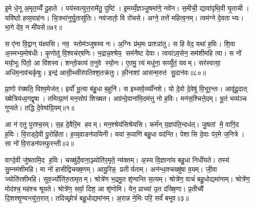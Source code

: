 इ॒मे धे॒नू अ॒मृत॒य्येँ दु॒हाते। पय॑स्वत्युत्त॒रामे॑तु॒ पुष्टि॑। इ॒मय्यँ॒ज्ञञ्जु॒षमा॑णे॒ नवे॑न। स॒मीची॒ द्यावा॑पृथि॒वी घृ॒ताची। यवि॑ष्ठो हव्य॒वाह॑नः। चि॒त्रभा॑नुर्घु॒तासु॑तिः। नव॑जातो॒ वि रो॑चसे। अग्ने॒ तत्ते॑ महित्व॒नम्। त्वम॑ग्ने दे॒वताभ्यः। भा॒गे दे॑व॒ न मी॑यसे॥७९॥

स ए॑ना वि॒द्वान् य॑क्ष्यसि। नव॒ स्तोम॑ञ्जुषस्व नः। अ॒ग्निः प्र॑थ॒मः प्राश्ञा॑तु। स हि वेद॒ यथा॑ ह॒विः। शि॒वा अ॒स्मभ्य॒मोष॑धीः। कृ॒णोतु॑ वि॒श्वच॑र्‌षणिः। भ॒द्रान्न॒श्श्रेय॒ सम॑नैष्ट देवाः। त्वया॑ऽव॒सेन॒ सम॑शीमहि त्वा। स नो॑ मयो॒भूः पि॑तो॒ आ वि॑शस्व। शन्तो॒काय॑ त॒नुवे स्यो॒नः। ए॒तमु॒ त्यं मधु॑ना॒ सय्युँ॑तं॒ यवम्। सर॑स्वत्या॒ अधि॑म॒नाव॑चर्कृषुः। इन्द्र॑ आसी॒थ्सीर॑पतिश्श॒तक्र॑तुः। की॒नाशा॑ आसन्म॒रुत॑ सु॒दान॑वः॥८०॥



\clearpage
{}
\setcounter{anuvakam}{0}
प्रा॒णो र॑ख्षति॒ विश्व॒मेज॑त्। इर्यो॑ भू॒त्वा ब॑हु॒धा ब॒हूनि॑। स इथ्सर्व॒व्व्याँ॑नशे। यो दे॒वो दे॒वेषु॑ वि॒भूर॒न्तः। आवृ॑दू॒दात् ख्षेत्रिय॑ध्व॒गद्वृषा। तमित्प्रा॒णं मन॒सोप॑ शिख्षत। अग्र॑न्दे॒वाना॑मि॒दम॑त्तु नो ह॒विः। मन॑स॒श्चित्ते॒दम्। भू॒तं भव्य॑ञ्च गुप्यते। तद्धि दे॒वेष्व॑ग्रि॒यम्॥१॥

आ न॑ एतु पुरश्च॒रम्। स॒ह दे॒वैरि॒म हवम्। मन॒श्श्रेय॑सिश्रेयसि। कर्म॑न् य॒ज्ञप॑ति॒न्दध॑त्। जु॒षतां मे॒ वागि॒द ह॒विः। वि॒राड्दे॒वी पु॒रोहि॑ता। ह॒व्य॒वा़डन॑पायिनी। यया॑ रू॒पाणि॑ बहु॒धा वद॑न्ति। पेशासि दे॒वाः प॑र॒मे ज॒नित्रे। सा नो॑ वि॒राडन॑पस्फुरन्ती॥२॥

वाग्दे॒वी जु॑षतामि॒द ह॒विः। चख्षु॑र्दे॒वाना॒ञ्ज्योति॑र॒मृते॒ न्य॑क्तम्। अ॒स्य वि॒ज्ञाना॑य बहु॒धा निधी॑यते। तस्य॑ सु॒म्नम॑शीमहि। मा नो॑ हासीद्विचख्ष॒णम्। आयु॒रिन्न॒ प्रतीर्यताम्। अन॑न्धा॒श्चख्षु॑षा व॒यम्। जी॒वा ज्योति॑रशीमहि। सुव॒र्ज्योति॑रु॒तामृतम्। श्रोत्रे॑ण भ॒द्रमु॒त शृ॑ण्वन्ति स॒त्यम्। श्रोत्रे॑ण॒ वाचं॑ बहु॒धोद्यमा॑नाम्। श्रोत्रे॑ण॒ मोद॑श्च॒ मह॑श्च श्रूयते। श्रोत्रे॑ण॒ सर्वा॒ दिश॒ आ शृ॑णोमि। येन॒ प्राच्या॑ उ॒त द॑ख्षि॒णा। प्र॒तीच्यै॑ दि॒शश्शृ॒ण्वन्त्यु॑त्त॒रात्। तदिच्छ्रोत्रं॑ बहु॒धोद्यमा॑नम्। अ॒रान्न ने॒मिः परि॒ सर्वं॑ बभूव॥३॥\anuvakamend[अ॒ग्रि॒यमन॑पस्फुरन्ती स॒त्य स॒प्त च॑]

